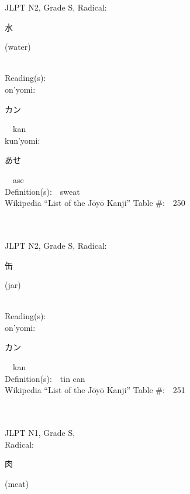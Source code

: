 \begin{multicols}{2}
{JLPT N2, Grade S, Radical:\ \ {\begin{CJK}{UTF8}{min} 水 \end{CJK}} (water) } \\
Reading(s):\ \ \\
{\hspace*{1em}}on'yomi:\ \ \\
{\hspace*{2em}}{\begin{CJK}{UTF8}{min} カン \end{CJK}}\ \ kan\ \ \\
{\hspace*{1em}}kun'yomi:\ \ \\
{\hspace*{2em}}{\begin{CJK}{UTF8}{min} あせ \end{CJK}}\ \ ase\ \ \\
Definition(s):\ \ sweat \\
Wikipedia ``List of the J\=oy\=o Kanji'' Table \#:\ \ 250 \\
\ \ \\
{\fontsize{34pt}{40pt}  }\ \ \\  %
{JLPT N2, Grade S, Radical:\ \ {\begin{CJK}{UTF8}{min} 缶 \end{CJK}} (jar) } \\
Reading(s):\ \ \\
{\hspace*{1em}}on'yomi:\ \ \\
{\hspace*{2em}}{\begin{CJK}{UTF8}{min} カン \end{CJK}}\ \ kan\ \ \\
Definition(s):\ \ tin can \\
Wikipedia ``List of the J\=oy\=o Kanji'' Table \#:\ \ 251 \\
\ \ \\
{\fontsize{34pt}{40pt}  }\ \ \\
{JLPT N1, Grade S, \\Radical:\ \ {\begin{CJK}{UTF8}{min} 肉 \end{CJK}} (meat) } \\

\end{multicols}
